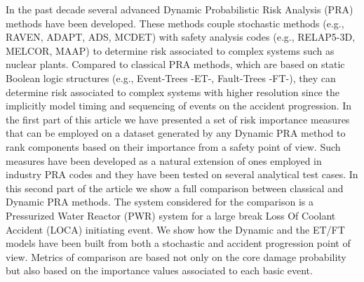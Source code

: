 In the past decade several advanced Dynamic Probabilistic Risk Analysis 
(PRA) methods have been developed. These methods couple stochastic methods
(e.g., RAVEN, ADAPT, ADS, MCDET) with safety analysis codes (e.g.,
RELAP5-3D, MELCOR, MAAP) to determine risk associated to complex systems
such as nuclear plants. Compared to classical PRA methods, which are
based on static Boolean logic structures (e.g., Event-Trees -ET-, Fault-Trees -FT-), 
they can determine risk associated to complex systems with higher resolution 
since the implicitly model timing and sequencing of events
on the accident progression.
In the first part of this article we have presented a set of risk importance 
measures that can be employed on a dataset generated by any Dynamic PRA method
to rank components based on their importance from a safety point of view.
Such measures have been developed as a natural extension of ones employed 
in industry PRA codes and they have been tested on several analytical test cases.
In this second part of the article we show a full comparison between classical and 
Dynamic PRA methods. The system considered for the comparison is a Pressurized
Water Reactor (PWR) system for a large break Loss Of Coolant Accident (LOCA)
initiating event.
We show how the Dynamic and the ET/FT models have been built from both a stochastic and 
accident progression point of view. 
Metrics of comparison are based not only on the core damage probability but also
based on the importance values associated to each basic event.